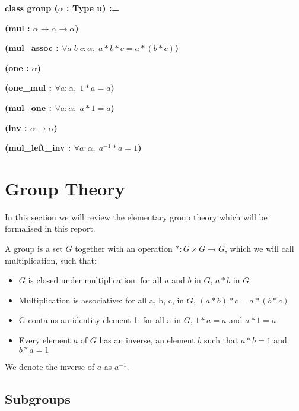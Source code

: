 \documentclass[runningheads,a4paper]{llncs}
\renewcommand{\a}{\alpha}
\renewcommand{\-}{\setminus}
\begin{document}
\vspace{2 mm}
\hspace{4 em}\textbf{class group ($\a$ : Type u) := }

\hspace{6 em}\textbf{(mul : $\a \to \a \to \a$)}

\hspace{6 em}\textbf{(mul\_assoc : $\forall a\; b\; c : \a,\; a * b * c = a * (b * c)$)}

\hspace{6 em}\textbf{(one : $\a$)}

\hspace{6 em}\textbf{(one\_mul : $\forall a : \a,\; 1 * a = a$)}

\hspace{6 em}\textbf{(mul\_one : $\forall a : \a,\; a * 1 = a$)}

\hspace{6 em}\textbf{(inv : $\a \to \a$)}

\hspace{6 em}\textbf{(mul\_left\_inv : $\forall a : \a,\; a^{-1} * a = 1$)}
\vspace{2 mm}

\section{Group Theory}

In this section we will review the elementary group theory\cite{artin} which will be formalised in this report.

\begin{definition}[Group] 
A group is a set $G$ together with an operation $* : G \times G \to G$, which we will call multiplication, such that:
\begin{itemize}
\item $G$ is closed under multiplication: for all $a$ and $b$ in $G$, $a*b$ in $G$
\item Multiplication is associative: for all a, b, c, in $G$, $(a*b)*c = a*(b*c)$
\item G contains an identity element 1: for all a in $G$, $1*a = a$ and $a*1=a$
\item Every element $a$ of $G$ has an inverse, an element $b$ such that $a*b = 1$ and $b*a =1$
\end{itemize}

We denote the inverse of $a$ as $a^{-1}$.
\end{definition}

\subsection{Subgroups}
\end{document}
